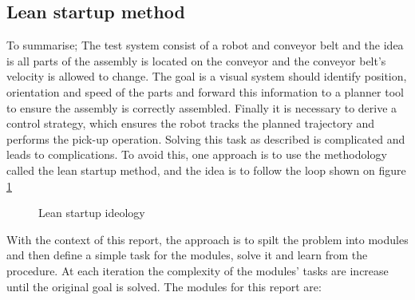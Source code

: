 \subsection{Lean startup method}\label{sub_lean_startup}
To summarise; The test system consist of a robot and conveyor belt and the idea is all parts of the assembly is located on the conveyor and the conveyor belt's velocity is allowed to change. The goal is a visual system should identify position, orientation and speed of the parts and forward this information to a planner tool to ensure the assembly is correctly assembled. Finally it is necessary to derive a control strategy, which ensures the robot tracks the planned trajectory and performs the pick-up operation. Solving this task as described is complicated and leads to complications. To avoid this, one approach is to use the methodology called the lean startup method, and the idea is to follow the loop shown on figure \ref{fig_lean_startup}
\begin{figure}[htbp!]
\centering
{}
  \caption{Lean startup ideology}
\label{fig_lean_startup}
\end{figure}\newline
With the context of this report, the approach is to spilt the problem into modules and then define a simple task for the modules, solve it and learn from the procedure. At each iteration the complexity of the modules' tasks are increase until the original goal is solved. The modules for this report are:

